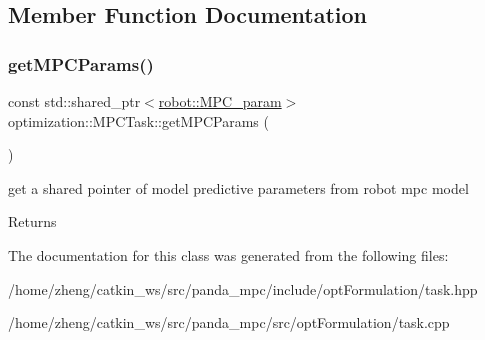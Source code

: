 \subsection{Member Function Documentation}
\mbox{\label{classoptimization_1_1_m_p_c_task_a11d2f4444268ce63a2472a9500c512cd}} 
\subsubsection{\texorpdfstring{get\+M\+P\+C\+Params()}{getMPCParams()}}
{\footnotesize\ttfamily const std\+::shared\+\_\+ptr$<$\hyperlink{structrobot_1_1_m_p_c__param}{robot\+::\+M\+P\+C\+\_\+param}$>$ optimization\+::\+M\+P\+C\+Task\+::get\+M\+P\+C\+Params (\begin{DoxyParamCaption}{ }\end{DoxyParamCaption})\hspace{0.3cm}{\ttfamily [inline]}}



get a shared pointer of model predictive parameters from robot mpc model 

\begin{DoxyReturn}{Returns}

\end{DoxyReturn}


The documentation for this class was generated from the following files\+:\begin{DoxyCompactItemize}
\item 
/home/zheng/catkin\+\_\+ws/src/panda\+\_\+mpc/include/opt\+Formulation/task.\+hpp\item 
/home/zheng/catkin\+\_\+ws/src/panda\+\_\+mpc/src/opt\+Formulation/task.\+cpp\end{DoxyCompactItemize}
